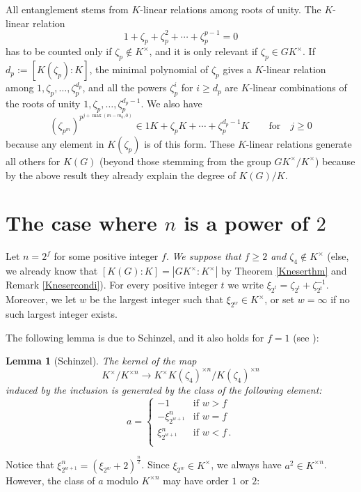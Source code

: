 \documentclass[11pt, a4paper]{amsart}
\newtheorem {lem}[thm]{Lemma}
\theoremstyle{definition}
\renewcommand{\geq}{\geqslant}
\begin{document}
All entanglement stems from $K$-linear relations among roots of unity. The $K$-linear relation
$$1+\zeta_p+\zeta_p^2+\cdots +\zeta_p^{p-1}=0$$
has to be counted only if $\zeta_p\notin K^\times$, and it is only relevant if $\zeta_p\in GK^\times$.
If $d_p:=[K(\zeta_p):K]$, the minimal polynomial of $\zeta_p$ gives a $K$-linear relation among $1,\zeta_p,\ldots,\zeta_p^{d_p}$, and all the powers $\zeta_p^i$ for $i\geq d_p$ are $K$-linear combinations of the roots of unity $1,\zeta_p,\ldots, \zeta_p^{d_p-1}$.
We also have 
$$(\zeta_{p^m})^{p^{j+\max(m-m_0,0)}}\in 1K+\zeta_pK+\cdots +\zeta_p^{d_p-1}K \qquad \text{for}\quad j\geq 0$$
because any element in $K(\zeta_p)$ is of this form.
These $K$-linear relations generate all others for $K(G)$ (beyond those stemming from the group $GK^\times/K^\times$) because by the above result they already explain the degree of $K(G)/K$.

\section{The case where $n$ is a power of $2$}\label{sec:better2}

Let $n=2^f$ for some positive integer $f$. \emph{We suppose that $f\geq 2$ and $\zeta_4\notin K^\times$} (else, we already know that $[K(G):K]=|GK^\times:K^\times|$ by Theorem \ref{Kneserthm} and Remark \ref{Knesercondi}).
For every positive integer $t$ we write $\xi_{2^t}=\zeta_{2^t}+\zeta_{2^t}^{-1}$. Moreover, we let $w$ be the largest integer such that $\xi_{2^w}\in K^\times$, or set $w=\infty$ if no such largest integer exists.

The following lemma is due to Schinzel, and it also holds for $f=1$ (see \cite[Lemma 2]{Schinzel-ab}):

\begin{lem}[Schinzel]\label{lemminoSchinzel}
 The kernel of the map
$$K^{\times}/K^{\times n}\rightarrow K^{\times}K(\zeta_4)^{\times n}/K(\zeta_4)^{\times n}
$$
induced by the inclusion is generated by the class of the following element:
$$a=\begin{cases} -1 & \text{if $w>f$}\\
-\xi_{2^{w+1}}^n & \text{if $w=f$} \\
\xi_{2^{w+1}}^n & \text{if $w<f$}\,. \\
\end{cases}$$
\end{lem}

Notice that $\xi_{2^{w+1}}^n=(\xi_{2^w}+2)^{\frac{n}{2}}$. Since $\xi_{2^w}\in K^{\times}$, we always have $a^2\in K^{\times n}$. However, the class of $a$ modulo $K^{\times n}$ may have order $1$ or $2$: 
\end{document}
